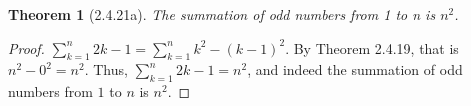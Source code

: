\documentclass[a4paper, 12pt]{article}
\theoremstyle{plain}
\newtheorem*{theorem*}{Theorem}
\begin{document}
	
	\begin{theorem*}[2.4.21a]
		The summation of odd numbers from 1 to n is $n^{2}$.
	\end{theorem*}
	
	\begin{proof}
		$\sum_{k=1}^{n} 2k - 1 = \sum_{k=1}^{n} k^{2} - (k-1)^{2}$. By Theorem 2.4.19, that is \newline $n^{2} - 0^{2} = n^{2}$. Thus, $\sum_{k=1}^{n} 2k - 1 = n^{2}$, and indeed the summation of odd numbers from $1$ to $n$ is $n^{2}$.
	\end{proof}
\end{document}
